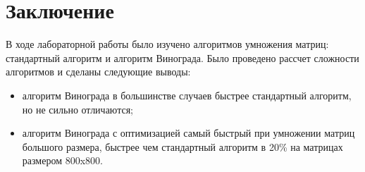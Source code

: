 \chapter*{Заключение}

В ходе лабораторной работы было изучено алгоритмов умножения матриц:
стандартный алгоритм и алгоритм Винограда. Было проведено рассчет сложности алгоритмов
и сделаны следующие выводы:

\begin{itemize}
    \item алгоритм Винограда в большинстве случаев быстрее стандартный алгоритм, но не сильно отличаются;
    \item алгоритм Винограда с оптимизацией самый быстрый при умножении матриц большого размера,
    быстрее чем стандартный алгоритм в 20\% на матрицах размером 800x800.
\end{itemize}
